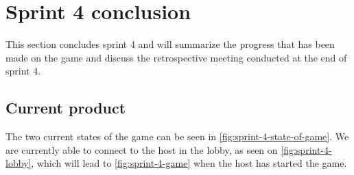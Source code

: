 \section{Sprint 4 conclusion}\label{sec:sprint4conclusion}
This section concludes sprint 4 and will summarize the progress that has been made on the game and discuss the retrospective meeting conducted at the end of sprint 4.

\subsection{Current product}
The two current states of the game can be seen in \autoref{fig:sprint-4-state-of-game}.
We are currently able to connect to the host in the lobby, as seen on \autoref{fig:sprint-4-lobby}, which will lead to \autoref{fig:sprint-4-game} when the host has started the game.
